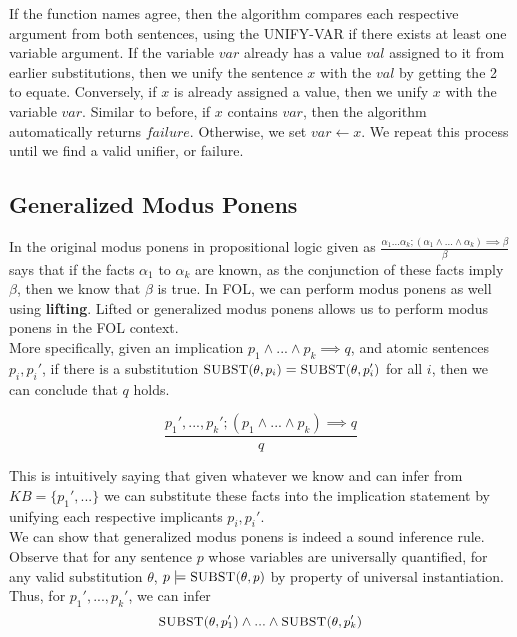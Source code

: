 \documentclass[12pt]{article}
\begin{document}
If the function names agree, then the algorithm compares each respective argument from both sentences, using the \textsc{\small{UNIFY-VAR}} if there exists at least one variable argument. If the variable $var$ already has a value $val$ assigned to it from earlier substitutions, then we unify the sentence $x$ with the $val$ by getting the 2 to equate. Conversely, if $x$ is already assigned a value, then we unify $x$ with the variable $var$. Similar to before, if $x$ contains $var$, then the algorithm automatically returns $failure$. Otherwise, we set $var \leftarrow x$. We repeat this process until we find a valid unifier, or failure.

\subsection{Generalized Modus Ponens}

In the original modus ponens in propositional logic given as $\frac{\alpha_1...\alpha_k; (\alpha_1 \land ... \land \alpha_k) \implies \beta}{\beta}$ says that if the facts $\alpha_1$ to $\alpha_k$ are known, as the conjunction of these facts imply $\beta$, then we know that $\beta$ is true. In FOL, we can perform modus ponens as well using \textbf{lifting}. Lifted or generalized modus ponens allows us to perform modus ponens in the FOL context.\\

More specifically, given an implication $p_1 \land ... \land p_k \implies q$, and atomic sentences $p_i, p_i'$, if there is a substitution $\textsc{\small{SUBST$(\theta, p_i$)}} = \textsc{\small{SUBST($\theta, p_i'$)}}$ for all $i$, then we can conclude that $q$ holds.

\begin{equation*}
\frac{p_1', ..., p_k'; (p_1 \land ... \land p_k) \implies q}{q}
\end{equation*}

This is intuitively saying that given whatever we know and can infer from $KB = \{p_1',...\}$ we can substitute these facts into the implication statement by unifying each respective implicants $p_i, p_i'$.\\

We can show that generalized modus ponens is indeed a sound inference rule. Observe that for any sentence $p$ whose variables are universally quantified, for any valid substitution $\theta$, $p \models \textsc{\small{SUBST($\theta, p$)}}$ by property of universal instantiation. Thus, for $p_1',...,p_k'$, we can infer 
\begin{equation*}
\textsc{\small{SUBST($\theta, p_1'$)}} \land ... \land \textsc{\small{SUBST($\theta, p_k'$)}}
\end{equation*}
\end{document}

